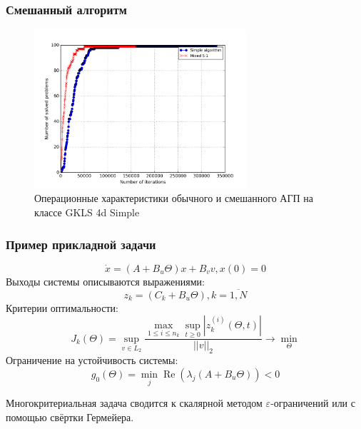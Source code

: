 \documentclass[aspectratio=1610]{beamer}
\DeclareMathOperator{\re}{Re}}
\begin{document}
\begin{frame}
  \frametitle{Смешанный алгоритм}
  \begin{figure}
    \center
      \includegraphics[width=0.7\textwidth]{mixed_op4d.png}
      \caption*{Операционные характеристики обычного и смешанного АГП на классе GKLS 4d Simple}
  \end{figure}
\end{frame}

\begin{frame}
  \frametitle{Пример прикладной задачи}

    \begin{displaymath}
      \dot x = (A+B_u\Theta)x + B_v v, x(0)=0
    \end{displaymath}
    Выходы системы описываются выражениями:
    \begin{displaymath}
      z_k=(C_k+B_u\Theta),k=\overline{1,N}
    \end{displaymath}
    Критерии оптимальности:
    \begin{displaymath}
      J_k(\Theta)=\sup_{v\in L_2} \frac{\max_{1\leqslant i \leqslant n_k} \sup_{t\geqslant 0}|z_k^{(i)}(\Theta,t)|}{||v||_2} \rightarrow\min_{\Theta}
    \end{displaymath}
    Ограничение на устойчивость системы:
    \begin{displaymath}
      g_0(\Theta)=\min_{j}\re(\lambda_j(A+B_u\Theta)) < 0
    \end{displaymath}

    Многокритериальная задача сводится к скалярной методом \(\varepsilon\)-ограничений или с помощью свёртки Гермейера.

\end{frame}
\end{document}
